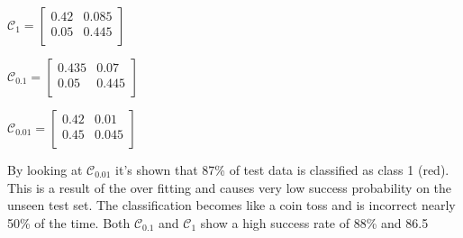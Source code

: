 \documentclass[twoside,twocolumn]{article}
\begin{document}
\begin{center}
$\mathcal{C}_1=  
\begin{bmatrix}
    0.42 & 0.085  \\
    0.05 & 0.445 \\
\end{bmatrix}$

$\mathcal{C}_{0.1}=  
\begin{bmatrix}
    0.435 & 0.07  \\
    0.05 & 0.445 \\
\end{bmatrix}$

$\mathcal{C}_{0.01}=  
\begin{bmatrix}
    0.42 & 0.01  \\
    0.45 & 0.045 \\
\end{bmatrix}$
\end{center}

By looking at $\mathcal{C}_{0.01}$ it's shown that 87\% of test data is classified as class 1 (red). This is a result of the over fitting and causes very low success probability on the unseen test set. The classification becomes like a coin toss and is incorrect nearly 50\% of the time. Both $\mathcal{C}_{0.1}$ and $\mathcal{C}_1$ show a high success rate of 88\% and 86.5%
\onecolumn
\end{document}
